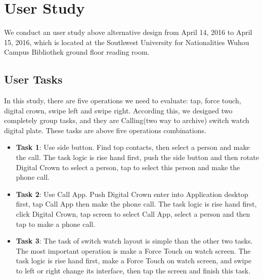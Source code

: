 \chapter{User Study}

We conduct an user study above alternative design from April 14, 2016 to April 15, 2016, which is located at the Southwest University for Nationalities Wuhou Campus Bibliothek ground floor reading room.

\section{User Tasks}

In this study, there are five operations we need to evaluate: tap, force touch, digital crown, swipe left and swipe right. According this, we designed two completely group tasks, and they are Calling(two way to archive) switch watch digital plate. These tasks are above five operations combinations.

\begin{itemize}
    \kaishu
    \item \textbf{Task 1}: Use side button. Find top contacts, then select a person and make the call. The task logic is rise hand first, push the side button and then rotate Digital Crown to select a person, tap to select this person and make the phone call.
    \item \textbf{Task 2}: Use Call App. Push Digital Crown enter into Application desktop first, tap Call App then make the phone call. The task logic is rise hand first, click Digital Crown, tap screen to select Call App, select a person and then tap to make a phone call.
    \item \textbf{Task 3}: The task of switch watch layout is simple than the other two tasks. The most important operation is make a Force Touch on watch screen. The task logic is rise hand first, make a Force Touch on watch screen, and swipe to left or right change its interface, then tap the screen and finish this task.
\end{itemize}

